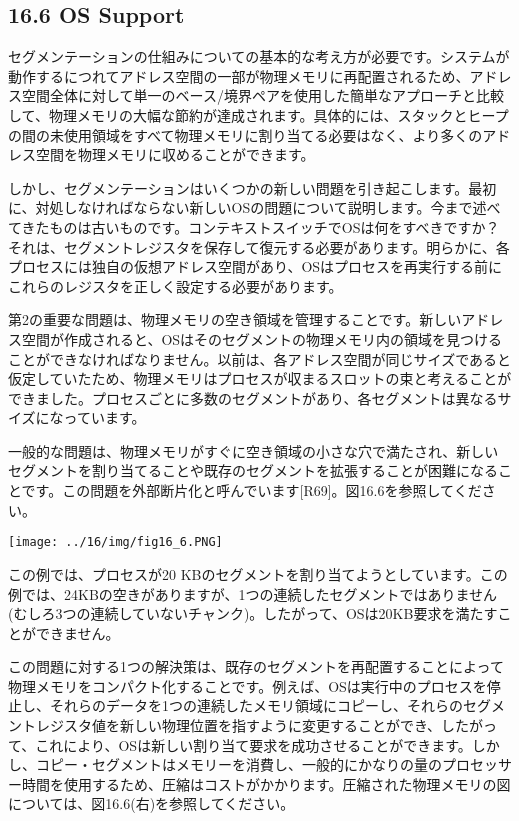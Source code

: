 \hypertarget{os-support}{%
\subsection*{16.6 OS Support}\label{os-support}}

セグメンテーションの仕組みについての基本的な考え方が必要です。システムが動作するにつれてアドレス空間の一部が物理メモリに再配置されるため、アドレス空間全体に対して単一のベース/境界ペアを使用した簡単なアプローチと比較して、物理メモリの大幅な節約が達成されます。具体的には、スタックとヒープの間の未使用領域をすべて物理メモリに割り当てる必要はなく、より多くのアドレス空間を物理メモリに収めることができます。

しかし、セグメンテーションはいくつかの新しい問題を引き起こします。最初に、対処しなければならない新しいOSの問題について説明します。今まで述べてきたものは古いものです。コンテキストスイッチでOSは何をすべきですか？それは、セグメントレジスタを保存して復元する必要があります。明らかに、各プロセスには独自の仮想アドレス空間があり、OSはプロセスを再実行する前にこれらのレジスタを正しく設定する必要があります。

第2の重要な問題は、物理メモリの空き領域を管理することです。新しいアドレス空間が作成されると、OSはそのセグメントの物理メモリ内の領域を見つけることができなければなりません。以前は、各アドレス空間が同じサイズであると仮定していたため、物理メモリはプロセスが収まるスロットの束と考えることができました。プロセスごとに多数のセグメントがあり、各セグメントは異なるサイズになっています。

一般的な問題は、物理メモリがすぐに空き領域の小さな穴で満たされ、新しいセグメントを割り当てることや既存のセグメントを拡張することが困難になることです。この問題を外部断片化と呼んでいます{[}R69{]}。図16.6を参照してください。

\texttt{[image: ../16/img/fig16\_6.PNG]}

この例では、プロセスが20
KBのセグメントを割り当てようとしています。この例では、24KBの空きがありますが、1つの連続したセグメントではありません(むしろ3つの連続していないチャンク)。したがって、OSは20KB要求を満たすことができません。

この問題に対する1つの解決策は、既存のセグメントを再配置することによって物理メモリをコンパクト化することです。例えば、OSは実行中のプロセスを停止し、それらのデータを1つの連続したメモリ領域にコピーし、それらのセグメントレジスタ値を新しい物理位置を指すように変更することができ、したがって、これにより、OSは新しい割り当て要求を成功させることができます。しかし、コピー・セグメントはメモリーを消費し、一般的にかなりの量のプロセッサー時間を使用するため、圧縮はコストがかかります。圧縮された物理メモリの図については、図16.6(右)を参照してください。

